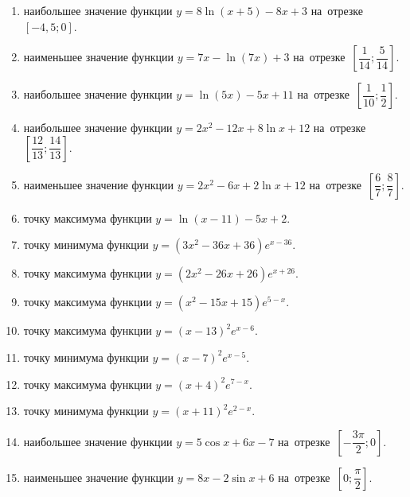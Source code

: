 \documentclass[a4paper,10pt]{article}
\begin{document}
\begin{enumerate}
\item {} наибольшее значение функции $y=8\ln \left(x+5\right)-8x+3$ на~отрезке~$\left[-4,5;0\right]$.

\item {} наименьшее значение функции $y=7x-\ln \left(7x\right)+3$ на~отрезке~$\left[\dfrac{1}{14};\dfrac{5}{14}\right]$.

\item {} наибольшее значение функции $y=\ln \left(5x\right)-5x+11$ на~отрезке~$\left[\dfrac{1}{10};\dfrac{1}{2}\right]$.

\item {} наибольшее значение функции $y=2x^2-12x+8\ln x+12$ на~отрезке~$\left[\dfrac{12}{13};\dfrac{14}{13}\right]$.

\item {} наименьшее значение функции $y=2x^2-6x+2\ln x+12$ на~отрезке~$\left[\dfrac{6}{7};\dfrac{8}{7}\right]$.

\item {} точку максимума функции $y=\ln \left(x-11\right)-5x+2$.

\item {} точку минимума функции $y=\left(3x^2-36x+36\right)e^{x-36}$.

\item {} точку максимума функции $y=\left(2x^2-26x+26\right)e^{x+26}$.

\item {} точку максимума функции $y=\left(x^2-15x+15\right)e^{5-x}$.

\item {} точку максимума функции $y=\left(x-13\right)^2e^{x-6}$.

\item {} точку минимума функции $y=\left(x-7\right)^2e^{x-5}$.

\item {} точку максимума функции $y=\left(x+4\right)^2e^{7-x}$.

\item {} точку минимума функции $y=\left(x+11\right)^2e^{2-x}$.

\item {} наибольшее значение функции $y=5\cos x+6x-7$ на~отрезке~$\left[-\dfrac{3\pi }{2};0\right]$.

\item {} наименьшее значение функции $y=8x-2\sin x+6$ на~отрезке~$\left[0;\dfrac{\pi }{2}\right]$.


\end{enumerate}
\end{document}
